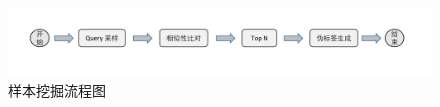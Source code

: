 \begin{figure}[h]
  \centering
  \includegraphics[width=1.0\linewidth]{Img/mining.pdf}
  \caption{样本挖掘流程图}
  \label{fig:mining}
\end{figure}

